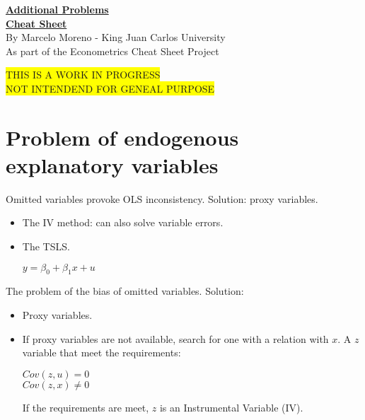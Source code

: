 \documentclass[10pt, a4paper, landscape]{extarticle}
\begin{document}
\setlength{\footskip}{12pt}

\begin{multicols}{3} %

\begin{center}
	\textbf{\LARGE \href{https://github.com/marcelomijas/econometrics-cheatsheet}{Additional Problems \\ Cheat Sheet}}
	\\ {\footnotesize By Marcelo Moreno - King Juan Carlos University}
	\\ {\footnotesize As part of the Econometrics Cheat Sheet Project}
\end{center}

\colorbox{yellow}{THIS IS A WORK IN PROGRESS}
\\ \colorbox{yellow}{NOT INTENDEND FOR GENEAL PURPOSE}

\section*{Problem of endogenous explanatory variables}
	Omitted variables provoke OLS inconsistency. Solution: proxy variables.
	\begin{itemize}[leftmargin=*]
		\item The IV method: can also solve variable errors.
		\item The TSLS.
		\begin{center}
			$y = \beta_0 + \beta_1 x + u$
		\end{center}
	\end{itemize}
	The problem of the bias of omitted variables. Solution:
	\begin{itemize}[leftmargin=*]
		\item Proxy variables.
		\item If proxy variables are not available, search for one with a relation with $x$. A $z$ variable that meet the requirements:
		\begin{center}
			$Cov(z,u) = 0$
			\\ $Cov(z,x) \neq 0$
		\end{center}
		If the requirements are meet, $z$ is an Instrumental Variable (IV).
	\end{itemize}

\end{multicols}
\end{document}
